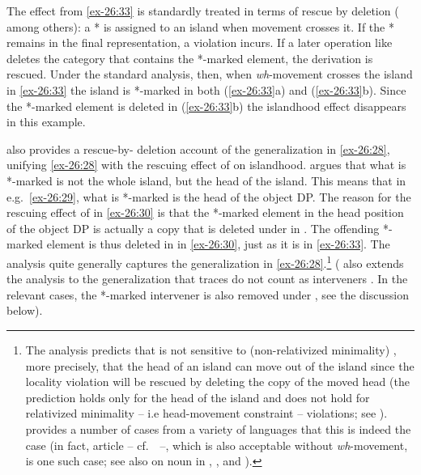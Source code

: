 \documentclass[output=paper]{langsci/langscibook}
\begin{document}
\ea\label{ex-26:33}
    \hfill\parencite[276]{Ross1969}
    \z
\z

The effect from \eqref{ex-26:33} is standardly treated in terms of rescue by  deletion
(\citealt{Chomsky:1972,Merchant2001,Lasnik2001,FoxLas2003,HorLasUr2003,%
BoeLas2006,Boskovic2011} among others): a * is assigned to an island when
movement crosses it. If the * remains in the final  representation, a
violation incurs. If a later operation like  deletes the category that
contains the *-marked element, the derivation is rescued.  Under the standard
analysis, then, when \emph{wh}-movement crosses the island in \eqref{ex-26:33} the island
is *-marked in both (\ref{ex-26:33}a) and (\ref{ex-26:33}b). Since the *-marked element is deleted in
(\ref{ex-26:33}b) the islandhood effect disappears in this example.

\textcite{Boskovic2011,Boskovic2013b} also provides a
rescue-by- deletion account of the generalization in \eqref{ex-26:28},
unifying \eqref{ex-26:28} with the rescuing effect of  on islandhood.
\citeauthor{Boskovic2011} argues that what is *-marked is not the whole island,
but the head of the island. This means that in e.g.\ \eqref{ex-26:29}, what is *-marked is
the head of the object DP. The reason for the rescuing effect of 
in \eqref{ex-26:30} is that the *-marked element in the head position of the object DP is
actually a copy that is deleted under  in . The
offending *-marked element is thus deleted in  in \eqref{ex-26:30}, just
as it is in \eqref{ex-26:33}. The analysis quite generally captures the generalization in
\eqref{ex-26:28}.\footnote{The analysis predicts that  is not sensitive to
    (non-relativized minimality) , more precisely, that the head
    of an island can move out of the island since the locality violation will
    be rescued by deleting the copy of the moved head (the prediction holds
    only for the head of the island and does not hold for relativized
    minimality -- i.e head-movement constraint -- violations; see
    \citealt{Boskovic2013b}). \textcite{Boskovic2013b} provides a number of
    cases from a variety of languages that this is indeed the case (in fact,
     article  -- cf.\ ~--, which is also
    acceptable without \emph{wh}-movement, is one such case; see also
\citealt{Boskovic2013b} on noun  in ,
, and ).} (\citealt{Boskovic2011} also extends
the analysis to the generalization that traces do not count as interveners
\parencite{Chomsky1995}.  In the relevant cases, the *-marked intervener is
also removed under  , see the discussion below).
\end{document}
